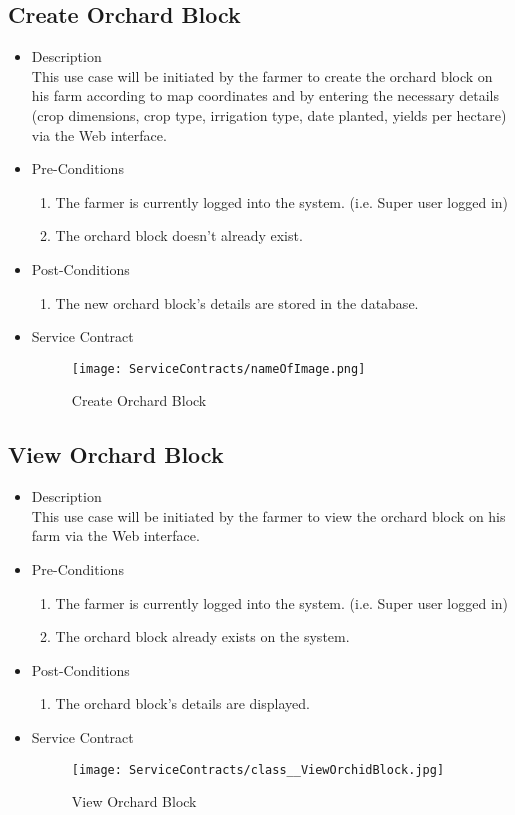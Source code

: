 \documentclass[11pt,fleqn]{book} %
\begin{document}
\subsection{Create Orchard Block}
\begin{itemize}
	\item Description\\
	This use case will be initiated by the farmer to create the orchard block on his farm according to map coordinates and by entering the necessary details (crop dimensions, crop type, irrigation type, date planted, yields per hectare) via the Web interface.
	\item Pre-Conditions
	\begin{enumerate}
		\item The farmer is currently logged into the system. (i.e. Super user logged in)
		\item The orchard block doesn't already exist.
	\end{enumerate}
	\item Post-Conditions
	\begin{enumerate}
		\item The new orchard block’s details are stored in the database.		
	\end{enumerate}
	\item Service Contract
	\begin{figure}
		\texttt{[image: ServiceContracts/nameOfImage.png]}
		\caption{Create Orchard Block}
	\end{figure}
\end{itemize}

\subsection{View Orchard Block}
\begin{itemize}
	\item Description\\
	This use case will be initiated by the farmer to view the orchard block on his farm via the Web interface.
	\item Pre-Conditions
	\begin{enumerate}
		\item The farmer is currently logged into the system. (i.e. Super user logged in)
		\item The orchard block already exists on the system.					
	\end{enumerate}
	\item Post-Conditions
	\begin{enumerate}
		\item The orchard block’s details are displayed.
	\end{enumerate}
	\item Service Contract
	\begin{figure}
		\texttt{[image: ServiceContracts/class\_\_ViewOrchidBlock.jpg]}
		\caption{View Orchard Block}
	\end{figure}
\end{itemize}
\end{document}

